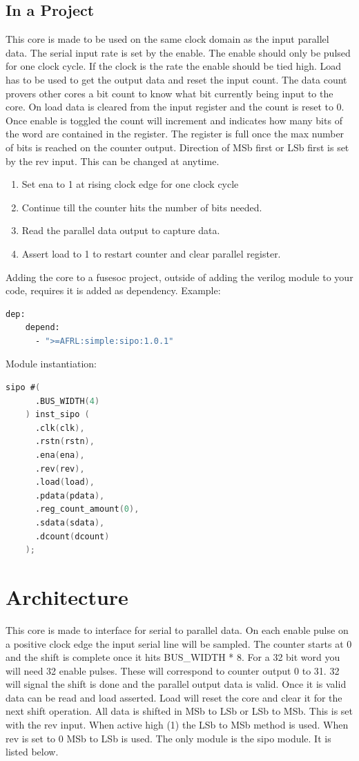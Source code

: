 \subsection{In a Project}
\par
This core is made to be used on the same clock domain as the input parallel data. The serial input rate is set by the enable.
The enable should only be pulsed for one clock cycle. If the clock is the rate the enable should be tied high. Load has to be
used to get the output data and reset the input count. The data count provers other cores a bit count to know what bit currently being
input to the core. On load data is cleared from the input register and the count is reset to 0. Once enable is toggled the count
will increment and indicates how many bits of the word are contained in the register. The register is full once the max number
of bits is reached on the counter output. Direction of MSb first or LSb first is set by the rev input. This can be changed at anytime.
\begin{enumerate}
  \item Set ena to 1 at rising clock edge for one clock cycle
  \item Continue till the counter hits the number of bits needed.
  \item Read the parallel data output to capture data.
  \item Assert load to 1 to restart counter and clear parallel register.
\end{enumerate}

Adding the core to a fusesoc project, outside of adding the verilog module to your code, requires it is added as dependency.
Example:
\begin{lstlisting}[language=bash]
  dep:
    depend:
      - ">=AFRL:simple:sipo:1.0.1"
\end{lstlisting}

Module instantiation:
\begin{lstlisting}[language=Verilog]
    sipo #(
      .BUS_WIDTH(4)
    ) inst_sipo (
      .clk(clk),
      .rstn(rstn),
      .ena(ena),
      .rev(rev),
      .load(load),
      .pdata(pdata),
      .reg_count_amount(0),
      .sdata(sdata),
      .dcount(dcount)
    );
\end{lstlisting}

\section{Architecture}
\par
This core is made to interface for serial to parallel data. On each enable pulse on a positive clock edge the input serial
line will be sampled. The counter starts at 0 and the shift is complete once it hits BUS\_WIDTH * 8. For a 32 bit word you will
need 32 enable pulses. These will correspond to counter output 0 to 31. 32 will signal the shift is done and the parallel output
data is valid. Once it is valid data can be read and load asserted. Load will reset the core and clear it for the next shift operation.
All data is shifted in MSb to LSb or LSb to MSb. This is set with the rev input. When active high (1) the LSb to MSb method is used. When
rev is set to 0 MSb to LSb is used.
The only module is the sipo module. It is listed below.

